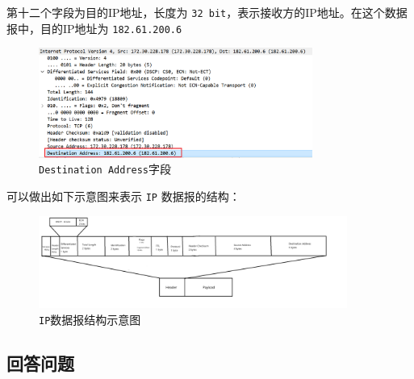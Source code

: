 \documentclass{article}
\begin{document}
第十二个字段为目的IP地址，长度为 \texttt{32 bit}，表示接收方的IP地址。在这个数据报中，目的IP地址为 \texttt{182.61.200.6}

\begin{figure}[H]
  \centering
  \includegraphics[width=0.8\textwidth]{img/20.png}
  \caption{\texttt{Destination Address}字段}
  \label{fig:19}
\end{figure}

可以做出如下示意图来表示 \texttt{IP} 数据报的结构：

\begin{figure}[H]
  \centering
  \includegraphics[width=0.9\textwidth]{img/21.png}
  \caption{\texttt{IP}数据报结构示意图}
  \label{fig:20}
\end{figure}

\subsection{回答问题}
\end{document}
